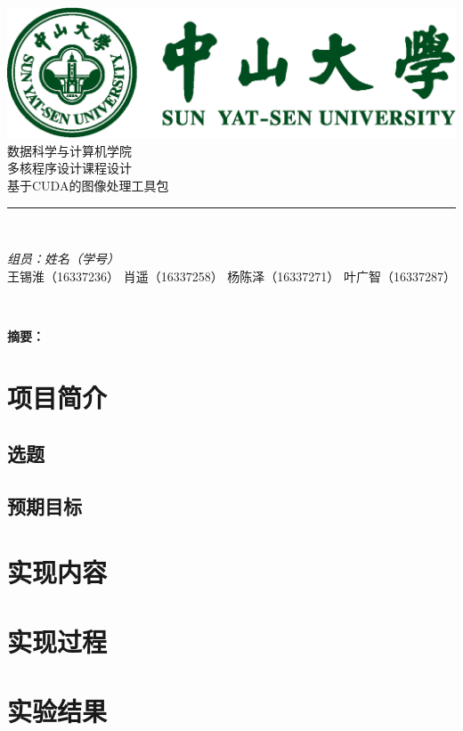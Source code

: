 \documentclass[12pt,AutoFakeBold]{ctexart}
\begin{document}
    \begin{titlepage}
        \centering
        \vspace*{0.5 cm}
        \includegraphics[scale = 0.5]{img/SYSULogo.png}\\[1.0 cm] %
        \textsc{\LARGE 数据科学与计算机学院}\\[0.2 cm]
        \textsc{\Large 多核程序设计课程设计}\\[0.2 cm]
        \textsc{\large 基于CUDA的图像处理工具包}\\[0.2 cm]
        \rule{\linewidth}{0.2 mm} \\[0.4 cm]
        { \huge \bfseries}
        
        \begin{minipage}{0.4\textwidth}
                \begin{flushright} 
                \emph{组员：姓名（学号）} \\
                王锡淮（16337236）\linebreak
                肖遥（16337258）\linebreak
                杨陈泽（16337271）\linebreak
                叶广智（16337287）\linebreak
            \end{flushright}
        \end{minipage}\\[2 cm]
        \vfill
        
    \end{titlepage}




\tableofcontents
\newpage

\textbf{摘要：}

\section{项目简介}

\subsection{选题}

\subsection{预期目标}

\section{实现内容}

\section{实现过程}

\section{实验结果}

\renewcommand\refname{参考文献} 
% 
\end{document}
